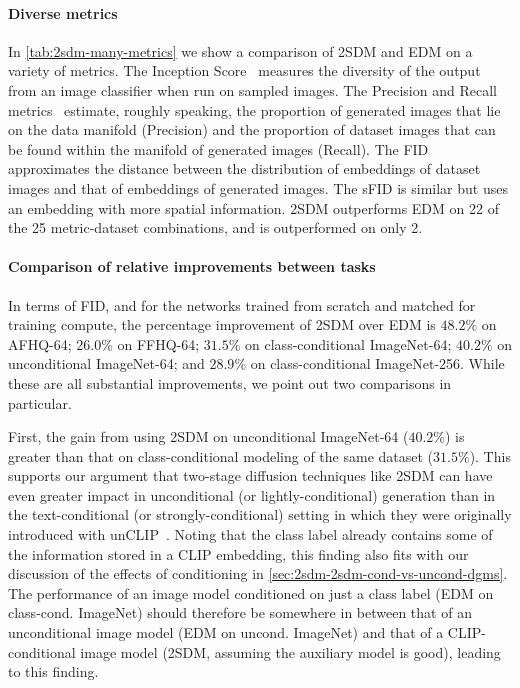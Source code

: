 \paragraph{Diverse metrics}
In \cref{tab:2sdm-many-metrics} we show a comparison of 2SDM and EDM on a variety of metrics. The Inception Score~\citep{salimans2016improved,barratt2018note} measures the diversity of the output from an image classifier when run on sampled images. The Precision and Recall metrics~\citep{kynkaanniemi2019improved} estimate, roughly speaking, the proportion of generated images that lie on the data manifold (Precision) and the proportion of dataset images that can be found within the manifold of generated images (Recall). The FID approximates the distance between the distribution of embeddings of dataset images and that of embeddings of generated images. The sFID is similar but uses an embedding with more spatial information. 2SDM outperforms EDM on 22 of the 25 metric-dataset combinations, and is outperformed on only 2.

\paragraph{Comparison of relative improvements between tasks}
In terms of FID, and for the networks trained from scratch and matched for training compute, the percentage improvement of 2SDM over EDM is $48.2\%$ on AFHQ-64; $26.0\%$ on FFHQ-64; $31.5\%$ on class-conditional ImageNet-64; $40.2\%$ on unconditional ImageNet-64; and $28.9\%$ on class-conditional ImageNet-256. While these are all substantial improvements, we point out two comparisons in particular. 

First, the gain from using 2SDM on unconditional ImageNet-64 ($40.2\%$) is greater than that on class-conditional modeling of the same dataset ($31.5\%$). This supports our argument that two-stage diffusion techniques like 2SDM can have even greater impact in unconditional (or lightly-conditional) generation than in the text-conditional (or strongly-conditional) setting in which they were originally introduced with unCLIP~\citep{ramesh2022hierarchical}.  Noting that the class label already contains some of the information stored in a CLIP embedding, this finding also fits with our discussion of the effects of conditioning in \cref{sec:2sdm-2sdm-cond-vs-uncond-dgms}. The performance of an image model conditioned on just a class label (EDM on class-cond. ImageNet) should therefore be somewhere in between that of an unconditional image model (EDM on uncond. ImageNet) and that of a CLIP-conditional image model (2SDM, assuming the auxiliary model is good), leading to this finding.

